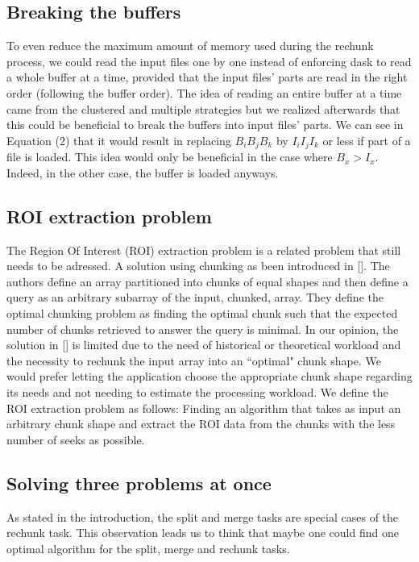\documentclass[conference]{IEEEtran}
\begin{document}
\subsection{Breaking the buffers}
To even reduce the maximum amount of memory used during the rechunk process, we
could read the input files one by one instead of enforcing dask to read a whole
buffer at a time, provided that the input files' parts are read in the right
order (following the buffer order). The idea of reading an entire buffer at a
time came from the clustered and multiple strategies but we realized afterwards
that this could be beneficial to break the buffers into input files' parts. We
can see in Equation (2) that it would result in replacing $B_iB_jB_k$ by
$I_iI_jI_k$ or less if part of a file is loaded. This idea would only be
beneficial in the case where $B_x>I_x$. Indeed, in the other case, the buffer is
loaded anyways.

\subsection{ROI extraction problem}
The Region Of Interest (ROI) extraction problem is a related problem that still needs
to be adressed. A solution using chunking as been introduced in []. The authors
define an array partitioned into chunks of equal shapes and then define a
query as an arbitrary subarray of the input, chunked, array. They define the
optimal chunking problem as finding the optimal chunk such that the expected
number of chunks retrieved to answer the query is minimal. In our opinion, the
solution in [] is limited due to the need of historical or theoretical workload
and the necessity to rechunk the input array into an ``optimal" chunk shape. We
would prefer letting the application choose the appropriate chunk shape
regarding its needs and not needing to estimate the processing workload. We
define the ROI extraction problem as follows: Finding an algorithm that takes
as input an arbitrary chunk shape and extract the ROI data from the chunks with
the less number of seeks as possible.

\subsection{Solving three problems at once}
As stated in the introduction, the split and merge tasks are special cases of
the rechunk task. This observation leads us to think that maybe one could find
one optimal algorithm for the split, merge and rechunk tasks.
\end{document}
